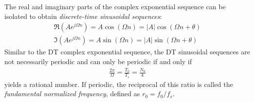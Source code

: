 \documentclass{report}
\begin{document}
\\ \\
The real and imaginary parts of the complex exponential sequence can be isolated to obtain \emph{discrete-time sinusoidal sequences}:
\begin{align}
    \Re(Ae^{j\Omega n}) = A \cos(\Omega n) = |A| \cos(\Omega n + \theta) \\
    \Im(Ae^{j\Omega n}) = A \sin(\Omega n) = |A| \sin(\Omega n + \theta)
\end{align}
Similar to the DT complex exponential sequence, the DT sinusoidal sequences are not necessarily periodic and can only be periodic if and only if
\begin{align}
    \frac{2\pi}{\Omega} = \frac{T_0}{T_s} = \frac{N_0}{k}
\end{align}
yields a rational number. If periodic, the reciprocal of this ratio is called the \emph{fundamental normalized frequency}, defined as $r_0=f_0/f_s$.
\end{document}
